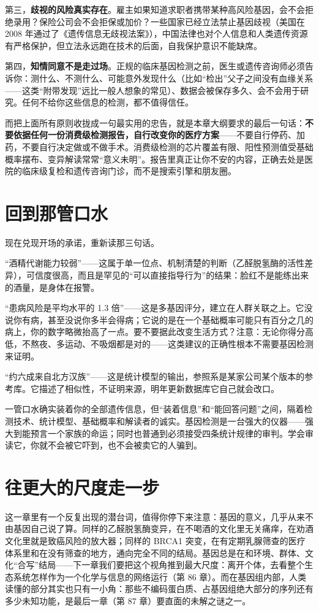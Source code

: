 第三，\textbf{歧视的风险真实存在}。雇主如果知道求职者携带某种高风险基因，会不会拒绝录用？保险公司会不会拒保或加价？一些国家已经立法禁止基因歧视（美国在 2008 年通过了《遗传信息无歧视法案》），中国法律也对个人信息和人类遗传资源有严格保护，但立法永远跑在技术的后面，自我保护意识不能缺席。

第四，\textbf{知情同意不是走过场}。正规的临床基因检测之前，医生或遗传咨询师必须告诉你：测什么、不测什么、可能意外发现什么（比如“检出”父子之间没有血缘关系——这类“附带发现”远比一般人想象的常见）、数据会被保存多久、会不会用于研究。任何不给你这些信息的检测，都不值得信任。

而把上面所有原则收拢成一句最实用的忠告，就是本章大纲要求的最后一句话：\textbf{不要依据任何一份消费级检测报告，自行改变你的医疗方案}——不要自行停药、加药，不要自行决定做或不做手术。消费级检测的芯片覆盖有限、阳性预测值受基础概率摆布、变异解读常常“意义未明”。报告里真正让你不安的内容，正确去处是医院的临床级复检和遗传咨询门诊，而不是搜索引擎和朋友圈。

\section{回到那管口水}

现在兑现开场的承诺，重新读那三句话。

“酒精代谢能力较弱”——这属于单一位点、机制清楚的判断（乙醛脱氢酶的活性差异），可信度很高，而且是罕见的“可以直接指导行为”的结果：脸红不是能练出来的酒量，是身体在报警。

“患病风险是平均水平的 1.3 倍”——这是多基因评分，建立在人群关联之上。它没说你有病，甚至没说你多半会得病；它说的是在一个基础概率可能只有百分之几的病上，你的数字略微抬高了一点。要不要据此改变生活方式？注意：无论你得分高低，不熬夜、多运动、不吸烟都是对的——这类建议的正确性根本不需要基因检测来证明。

“约六成来自北方汉族”——这是统计模型的输出，参照系是某家公司某个版本的参考库。它描述了相似性，不证明来源，明年更新数据库它自己就会改口。

一管口水确实装着你的全部遗传信息，但“装着信息”和“能回答问题”之间，隔着检测技术、统计模型、基础概率和解读者的诚实。基因检测是一台强大的仪器——强大到能预言一个家族的命运；同时也普通到必须接受四条统计规律的审判。学会审读它，你就不会被它吓到，也不会被卖它的人骗到。

\section{往更大的尺度走一步}

这一章里有一个反复出现的潜台词，值得你停下来注意：基因的意义，几乎从来不由基因自己说了算。同样的乙醛脱氢酶变异，在不喝酒的文化里无关痛痒，在劝酒文化里就是致癌风险的放大器；同样的 BRCA1 突变，在有定期乳腺筛查的医疗体系里和在没有筛查的地方，通向完全不同的结局。基因总是在和环境、群体、文化“合写”结局——下一章我们要把这个视角推到最大尺度：离开个体，去看整个生态系统怎样作为一个化学与信息的网络运行（第 86 章）。而在基因组内部，人类读懂的部分其实也只有一小角：那些不编码蛋白质、占基因组绝大部分的序列还有多少未知功能，是最后一章（第 87 章）要直面的未解之谜之一。

